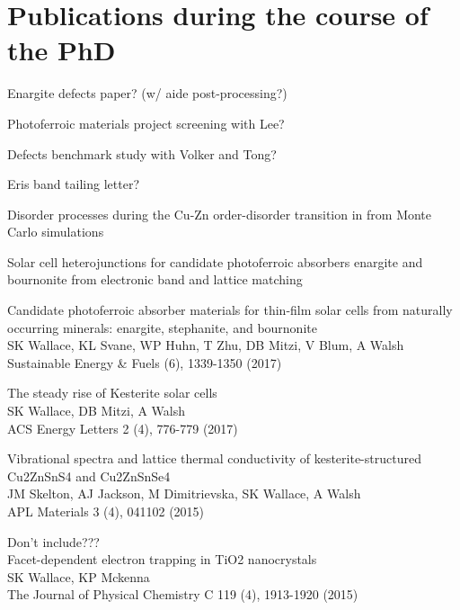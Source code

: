 \documentclass[11pt, twoside]{report}
\begin{document}
\section*{Publications during the course of the PhD}
\begin{etaremune}
\item Enargite defects paper? (w/ aide post-processing?)
\item Photoferroic materials project screening with Lee?
\item Defects benchmark study with Volker and Tong?
\item Eris band tailing letter?
\item Disorder processes during the Cu-Zn order-disorder transition in {\CZTS} from Monte Carlo simulations
\item Solar cell heterojunctions for candidate photoferroic absorbers enargite
and bournonite from electronic band and lattice matching
\item Candidate photoferroic absorber materials for thin-film solar cells from naturally occurring minerals: enargite, stephanite, and bournonite\\
SK Wallace, KL Svane, WP Huhn, T Zhu, DB Mitzi, V Blum, A Walsh\\ Sustainable Energy \& Fuels  (6), 1339-1350 (2017)
\item The steady rise of Kesterite solar cells\\ SK Wallace, DB Mitzi, A Walsh\\ ACS Energy Letters 2 (4), 776-779 (2017)
\item Vibrational spectra and lattice thermal conductivity of kesterite-structured Cu2ZnSnS4 and Cu2ZnSnSe4\\ JM Skelton, AJ Jackson, M Dimitrievska, SK Wallace, A Walsh\\ APL Materials 3 (4), 041102 (2015)
\item Don't include???\\ Facet-dependent electron trapping in TiO2 nanocrystals\\ SK Wallace, KP Mckenna\\ The Journal of Physical Chemistry C 119 (4), 1913-1920 (2015)
\end{etaremune}


\tableofcontents
{}
\listoffigures
{}
\listoftables
{}
\end{document}
